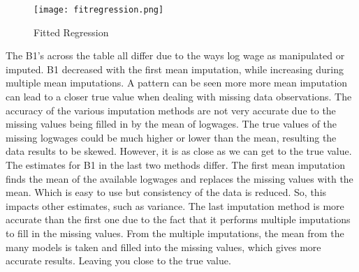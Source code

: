 \documentclass{article}
\begin{document}
\begin{figure}[]
\caption{Fitted Regression}
\centering
\texttt{[image: fitregression.png]}
\end{figure}
\newpage


The B1's across the table all differ due to the ways log wage as manipulated or imputed. B1 decreased with the first mean imputation, while increasing during multiple mean imputations. A pattern can be seen more more mean imputation can lead to a closer true value when dealing with missing data observations. The accuracy of the various imputation methods are not very accurate due to the missing values being filled in by the mean of logwages. The true values of the missing logwages could be much higher or lower than the mean, resulting the data results to be skewed. However, it is as close as we can get to the true value.\\
The estimates for B1 in the last two methods differ. The first mean imputation finds the mean of the available logwages and replaces the missing values with the mean. Which is easy to use but consistency of the data is reduced. So, this impacts other estimates, such as variance. The last imputation method is more accurate than the first one due to the fact that it performs multiple imputations to fill in the missing values. From the multiple imputations, the mean from the many models is taken and filled into the missing values, which gives more accurate results. Leaving you close to the true value. 
\end{document}
